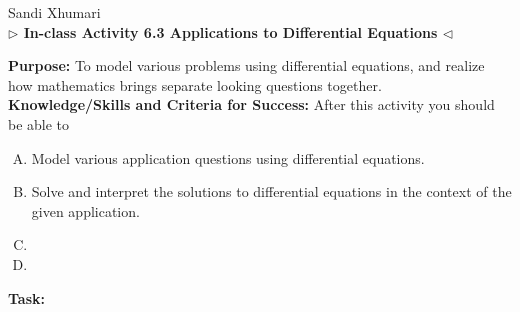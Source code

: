 \documentclass[answers]{exam}
\begin{document}
\begin{center}
 \hfill Sandi Xhumari \\ \textbf{$\triangleright$ In-class Activity 6.3 Applications to Differential Equations $\triangleleft$}\\
\end{center}


\textbf{Purpose:} To model various problems using differential equations, and realize how mathematics brings separate looking questions together.  \\





\textbf{Knowledge/Skills and Criteria for Success:} After this activity you should be able to
\begin{enumerate}[A.]
\item Model various application questions using differential equations.
\item Solve and interpret the solutions to differential equations in the context of the given application.
\item 
\item 

\end{enumerate}

\textbf{Task:} 
\end{document}
